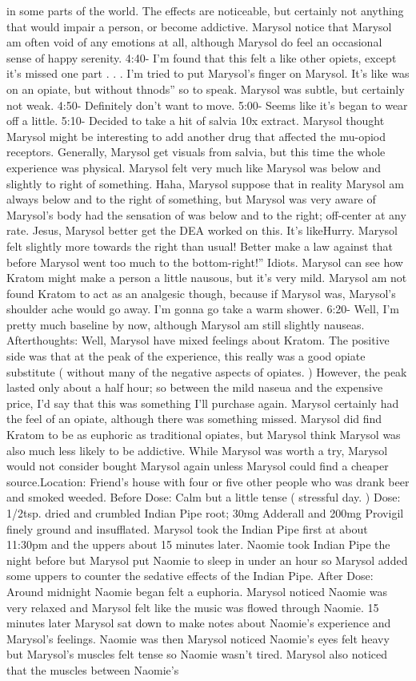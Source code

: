 \documentclass[12pt]{book}
\begin{document}
in some parts of the world. The effects are noticeable, but certainly not anything that would impair a person, or become addictive. Marysol notice that Marysol am often void of any emotions at all, although Marysol do feel an occasional sense of happy serenity. 4:40- I'm found that this felt a like other opiets, except it's missed one part . . .  I'm tried to put Marysol's finger on Marysol. It's like was on an opiate, but without thnods'' so to speak. Marysol was subtle, but certainly not weak. 4:50- Definitely don't want to move. 5:00- Seems like it's began to wear off a little. 5:10- Decided to take a hit of salvia 10x extract. Marysol thought Marysol might be interesting to add another drug that affected the mu-opiod receptors. Generally, Marysol get visuals from salvia, but this time the whole experience was physical. Marysol felt very much like Marysol was below and slightly to right of something. Haha, Marysol suppose that in reality Marysol am always below and to the right of something, but Marysol was very aware of Marysol's body had the sensation of was below and to the right; off-center at any rate. Jesus, Marysol better get the DEA worked on this. It's likeHurry. Marysol felt slightly more towards the right than usual! Better make a law against that before Marysol went too much to the bottom-right!'' Idiots. Marysol can see how Kratom might make a person a little nausous, but it's very mild. Marysol am not found Kratom to act as an analgesic though, because if Marysol was, Marysol's shoulder ache would go away. I'm gonna go take a warm shower. 6:20- Well, I'm pretty much baseline by now, although Marysol am still slightly nauseas. Afterthoughts: Well, Marysol have mixed feelings about Kratom. The positive side was that at the peak of the experience, this really was a good opiate substitute ( without many of the negative aspects of opiates. ) However, the peak lasted only about a half hour; so between the mild naseua and the expensive price, I'd say that this was something I'll purchase again. Marysol certainly had the feel of an opiate, although there was something missed. Marysol did find Kratom to be as euphoric as traditional opiates, but Marysol think Marysol was also much less likely to be addictive. While Marysol was worth a try, Marysol would not consider bought Marysol again unless Marysol could find a cheaper source.Location: Friend's house with four or five other people who was drank beer and smoked weeded. Before Dose: Calm but a little tense ( stressful day. ) Dose: 1/2tsp. dried and crumbled Indian Pipe root; 30mg Adderall and 200mg Provigil finely ground and insufflated. Marysol took the Indian Pipe first at about 11:30pm and the uppers about 15 minutes later. Naomie took Indian Pipe the night before but Marysol put Naomie to sleep in under an hour so Marysol added some uppers to counter the sedative effects of the Indian Pipe. After Dose: Around midnight Naomie began felt a euphoria. Marysol noticed Naomie was very relaxed and Marysol felt like the music was flowed through Naomie. 15 minutes later Marysol sat down to make notes about Naomie's experience and Marysol's feelings. Naomie was then Marysol noticed Naomie's eyes felt heavy but Marysol's muscles felt tense so Naomie wasn't tired. Marysol also noticed that the muscles between Naomie's 
\end{document}
